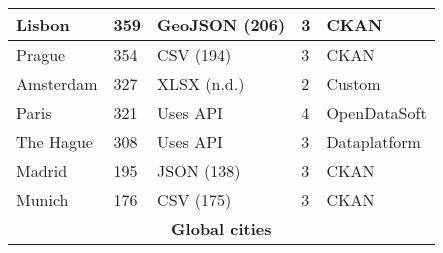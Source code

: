 \begin{table}[!ht]
\begin{tabular}{|lllll|}
    \multicolumn{1}{|l|}{Lisbon}                      & \multicolumn{1}{|l|}{359}                                              & \multicolumn{1}{|l|}{GeoJSON (206)}                                                   & \multicolumn{1}{|l|}{3}        & \multicolumn{1}{|l|}{CKAN}                                   \\ \hline
    \multicolumn{1}{|l|}{Prague}                      & \multicolumn{1}{|l|}{354}                                              & \multicolumn{1}{|l|}{CSV (194)}                                                       & \multicolumn{1}{|l|}{3}        & \multicolumn{1}{|l|}{CKAN}                                   \\ \hline
    \multicolumn{1}{|l|}{Amsterdam}                   & \multicolumn{1}{|l|}{327}                                              & \multicolumn{1}{|l|}{XLSX (n.d.)}                                                  & \multicolumn{1}{|l|}{2}        & \multicolumn{1}{|l|}{Custom}                                   \\ \hline
    \multicolumn{1}{|l|}{Paris}                       & \multicolumn{1}{|l|}{321}                                              & \multicolumn{1}{|l|}{Uses \acs{API}}                                                  & \multicolumn{1}{|l|}{4}        & \multicolumn{1}{|l|}{OpenDataSoft}                                   \\ \hline
    \multicolumn{1}{|l|}{The Hague}                   & \multicolumn{1}{|l|}{308}                                              & \multicolumn{1}{|l|}{Uses \acs{API}}                                                  & \multicolumn{1}{|l|}{3}        & \multicolumn{1}{|l|}{Dataplatform}                                   \\ \hline
    \multicolumn{1}{|l|}{Madrid}                      & \multicolumn{1}{|l|}{195}                                              & \multicolumn{1}{|l|}{JSON (138)}                                                      & \multicolumn{1}{|l|}{3}        & \multicolumn{1}{|l|}{CKAN}                                   \\ \hline
    \multicolumn{1}{|l|}{Munich}                      & \multicolumn{1}{|l|}{176}                                              & \multicolumn{1}{|l|}{CSV (175)}                                                       & \multicolumn{1}{|l|}{3}        & \multicolumn{1}{|l|}{CKAN}                                   \\ \hline
    \multicolumn{5}{|c|}{\textbf{Global cities}}      \\ \hline

\end{tabular}
\end{table}
